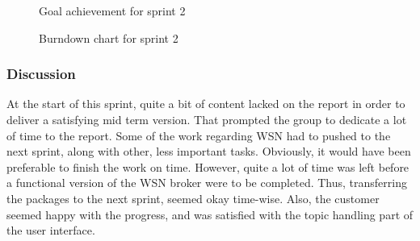 \begin{center}
  \begin{figure}[ht!]
    \caption{Goal achievement for sprint 2}
    \label{fig:sprint 2, goals}
  \end{figure}
\end{center}

\begin{center}
  \begin{figure}[ht!]
    \caption{Burndown chart for sprint 2}
    \label{fig:sprint 2, burndown}
  \end{figure}
\end{center}

\subsubsection{Discussion}

At the start of this sprint, quite a bit of content lacked on the report in order to deliver a satisfying mid term version. That prompted the group to dedicate a lot of time to the report. Some of the work regarding WSN had to pushed to the next sprint, along with other, less important tasks. Obviously, it would have been preferable to finish the work on time. However, quite a lot of time was left before a functional version of the WSN broker were to be completed. Thus, transferring the packages to the next sprint, seemed okay time-wise. Also, the customer seemed happy with the progress, and was satisfied with the topic handling part of the user interface.

